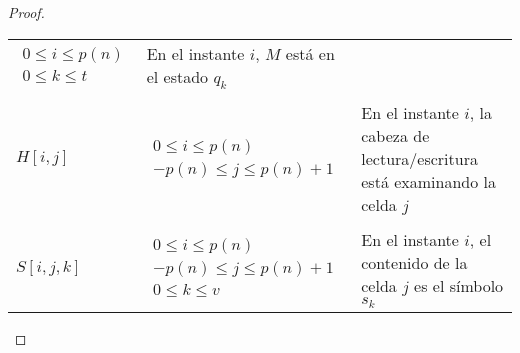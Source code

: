 \documentclass[a4paper, spanish, utf8]{memoir}
\begin{document}
\begin{proof}
\begin{table}[!ht]
\begin{center}
{\begin{tabular}{@{}C{.15\textwidth}C{.25\textwidth}L{.45\textwidth}@{}}
                           \begin{minipage}{.24\textwidth} %
                             \centering
                             \begin{math} %
                               \begin{array}{c} %
                                 0 \le i\le p(n)  \\ %
                                 0 \le k \le t %
                               \end{array}%
                             \end{math} %
                           \end{minipage} & En el instante $i$, $M$ está en el estado $q_k$ \\ \\
          $H[i,j]$       &

                           \begin{minipage}{.24\textwidth} %
                             \centering
                             \begin{math} %
                               \begin{array}{c} %
                                 0 \le i\le p(n) \\ %
                                 -p(n) \le j \le p(n) + 1 %
                               \end{array}%
                             \end{math} %
                           \end{minipage} & En el instante $i$, la cabeza de lectura/escritura está examinando la celda $j$\\ \\
          $S[i,j,k]$       &

                             \begin{minipage}{.24\textwidth} %
                               \centering
                               \begin{math} %
                                 \begin{array}{c} %
                                   0 \le i\le p(n) \\ %
                                   -p(n) \le j \le p(n) + 1 \\ %
                                   0 \le k \le v
                                 \end{array}%
                               \end{math} %
                             \end{minipage} & En el instante $i$, el contenido de la celda $j$ es el símbolo $s_k$\\
          \bottomrule
        \end{tabular}
      }
    \end{center}
  \end{table}



\end{proof}
\end{document}
